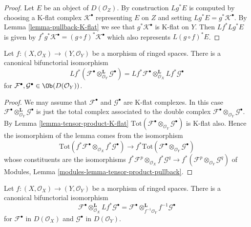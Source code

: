 \begin{proof}
Let $E$ be an object of $D(\mathcal{O}_Z)$.
By construction $Lg^*E$ is computed by choosing a K-flat complex
$\mathcal{K}^\bullet$ representing $E$ on $Z$ and
setting $Lg^*E = g^*\mathcal{K}^\bullet$.
By Lemma \ref{lemma-pullback-K-flat} we see that $g^*\mathcal{K}^\bullet$
is K-flat on $Y$. Then $Lf^*Lg^*E$ is given by
$f^*g^*\mathcal{K}^\bullet = (g \circ f)^*\mathcal{K}^\bullet$
which also represents $L(g \circ f)^*E$.
\end{proof}

\begin{lemma}
\label{lemma-pullback-tensor-product}
Let $f : (X, \mathcal{O}_X) \to (Y, \mathcal{O}_Y)$
be a morphism of ringed spaces. There is a canonical bifunctorial
isomorphism
$$
Lf^*(
\mathcal{F}^\bullet \otimes_{\mathcal{O}_Y}^{\mathbf{L}} \mathcal{G}^\bullet
) =
Lf^*\mathcal{F}^\bullet 
\otimes_{\mathcal{O}_X}^{\mathbf{L}}
Lf^*\mathcal{G}^\bullet 
$$
for $\mathcal{F}^\bullet, \mathcal{G}^\bullet \in \Ob(D(\mathcal{O}_Y))$.
\end{lemma}

\begin{proof}
We may assume that $\mathcal{F}^\bullet$ and $\mathcal{G}^\bullet$
are K-flat complexes. In this case
$\mathcal{F}^\bullet \otimes_{\mathcal{O}_Y}^{\mathbf{L}} \mathcal{G}^\bullet$
is just the total complex associated to the double complex
$\mathcal{F}^\bullet \otimes_{\mathcal{O}_Y} \mathcal{G}^\bullet$.
By
Lemma \ref{lemma-tensor-product-K-flat}
$\text{Tot}(\mathcal{F}^\bullet \otimes_{\mathcal{O}_Y} \mathcal{G}^\bullet)$
is K-flat also. Hence the isomorphism of the lemma comes from the
isomorphism
$$
\text{Tot}(f^*\mathcal{F}^\bullet \otimes_{\mathcal{O}_X}
f^*\mathcal{G}^\bullet)
\longrightarrow
f^*\text{Tot}(\mathcal{F}^\bullet \otimes_{\mathcal{O}_Y} \mathcal{G}^\bullet)
$$
whose constituents are the isomorphisms
$f^*\mathcal{F}^p \otimes_{\mathcal{O}_X} f^*\mathcal{G}^q \to
f^*(\mathcal{F}^p \otimes_{\mathcal{O}_Y} \mathcal{G}^q)$ of
Modules, Lemma \ref{modules-lemma-tensor-product-pullback}.
\end{proof}

\begin{lemma}
\label{lemma-variant-derived-pullback}
Let $f : (X, \mathcal{O}_X) \to (Y, \mathcal{O}_Y)$
be a morphism of ringed spaces. There is a canonical bifunctorial
isomorphism
$$
\mathcal{F}^\bullet
\otimes_{\mathcal{O}_X}^{\mathbf{L}}
Lf^*\mathcal{G}^\bullet
=
\mathcal{F}^\bullet 
\otimes_{f^{-1}\mathcal{O}_Y}^{\mathbf{L}}
f^{-1}\mathcal{G}^\bullet 
$$
for $\mathcal{F}^\bullet$ in $D(\mathcal{O}_X)$ and
$\mathcal{G}^\bullet$ in $D(\mathcal{O}_Y)$.
\end{lemma}

